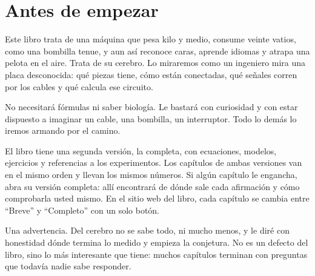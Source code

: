 \chapter*{Antes de empezar}

Este libro trata de una máquina que pesa kilo y medio, consume veinte vatios, como una bombilla tenue, y aun así reconoce caras, aprende idiomas y atrapa una pelota en el aire. Trata de su cerebro. Lo miraremos como un ingeniero mira una placa desconocida: qué piezas tiene, cómo están conectadas, qué señales corren por los cables y qué calcula ese circuito.

No necesitará fórmulas ni saber biología. Le bastará con curiosidad y con estar dispuesto a imaginar un cable, una bombilla, un interruptor. Todo lo demás lo iremos armando por el camino.

El libro tiene una segunda versión, la completa, con ecuaciones, modelos, ejercicios y referencias a los experimentos. Los capítulos de ambas versiones van en el mismo orden y llevan los mismos números. Si algún capítulo le engancha, abra su versión completa: allí encontrará de dónde sale cada afirmación y cómo comprobarla usted mismo. En el sitio web del libro, cada capítulo se cambia entre “Breve” y “Completo” con un solo botón.

Una advertencia. Del cerebro no se sabe todo, ni mucho menos, y le diré con honestidad dónde termina lo medido y empieza la conjetura. No es un defecto del libro, sino lo más interesante que tiene: muchos capítulos terminan con preguntas que todavía nadie sabe responder.
